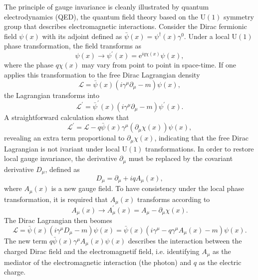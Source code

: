 The principle of gauge invariance is cleanly illustrated by quantum electrodynamics (QED), the quantum field theory based on the $\mathrm{U}(1)$ symmetry group that describes electromagnetic interactions. Consider the Dirac fermionic field $\psi(x)$ with its adjoint defined as $\bar{\psi}(x)=\psi^\dagger(x)\gamma^0$. Under a local $\mathrm{U}(1)$ phase transformation, the field transforms as
\begin{equation}
\psi(x) \to \psi^\prime(x)=\mathrm{e}^{iq\chi(x)}\psi(x),
\end{equation}
where the phase $q\chi(x)$ may vary from point to point in space-time. If one applies this transformation to the free Dirac Lagrangian density
\begin{equation}
\mathcal{L}=\bar{\psi}(x)(i\gamma^\mu\partial_\mu-m)\psi(x),
\end{equation}
the Lagrangian transforms into
\begin{equation}
\mathcal{L}^\prime=\bar{\psi}^\prime(x)(i\gamma^\mu\partial_\mu-m)\psi^\prime(x).
\end{equation}
A straightforward calculation shows that
\begin{equation}
\mathcal{L}^\prime=\mathcal{L}-q\bar{\psi}(x)\gamma^\mu
(\partial_\mu\chi(x))\psi(x),
\end{equation}
revealing an extra term proportional to $\partial_\mu\chi(x)$, indicating that the free Dirac Lagrangian is not ivariant under local $\mathrm{U}(1)$ transformations. In order to restore local gauge invariance, the derivative $\partial_\mu$ must be replaced by the covariant derivative $D_\mu$, defined as
\begin{equation}
D_\mu=\partial_\mu+iqA_\mu(x),
\end{equation}
where $A_\mu(x)$ is a new gauge field. To have consistency under the local phase transformation, it is required that $A_\mu(x)$ transforms according to
\begin{equation}
A_\mu(x) \to A_\mu^\prime(x)=A_\mu - \partial_\mu\chi(x).
\end{equation}
The Dirac Lagrangian then beomes
\begin{equation}
\mathcal{L}=\bar{\psi}(x)(i\gamma^\mu D_\mu -m)\psi(x)=\bar{\psi}(x)(i\gamma^\mu -q\gamma^\mu A_\mu(x)-m)\psi(x).
\end{equation}
The new term $q\bar{\psi}(x)\gamma^\mu A_\mu(x)\psi(x)$ describes the interaction between the charged Dirac field and the electromagnetif field, i.e. identifying $A_\mu$ as the mediator of the electromagnetic interaction (the photon) and $q$ as the electric charge.

